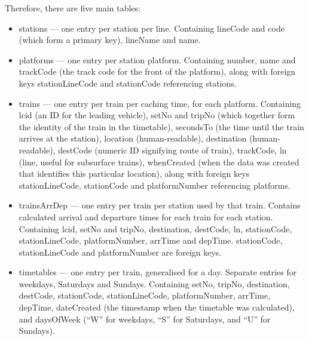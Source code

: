 \documentclass[a4paper,12pt,twoside]{report}
\begin{document}
Therefore, there are five main tables:
\begin{itemize}
  \item stations --- one entry per station per line. Containing lineCode and
    code (which form a primary key), lineName and name.
  \item platforms --- one entry per station platform. Containing number, name
    and trackCode (the track code for the front of the platform), along with
    foreign keys stationLineCode and stationCode referencing stations.
  \item trains --- one entry per train per caching time, for each platform.
    Containing lcid (an ID for the leading vehicle), setNo and tripNo (which
    together form the identity of the train in the timetable), secondsTo (the
    time until the train arrives at the station), location (human-readable),
    destination (human-readable), destCode (numeric ID signifying route of
    train), trackCode, ln (line, useful for subsurface trains), whenCreated
    (when the data was created that identifies this particular location), along
    with foreign keys stationLineCode, stationCode and platformNumber
    referencing platforms.
  \item trainsArrDep --- one entry per train per station used by that train.
    Contains calculated arrival and departure times for each train for each
    station. Containing lcid, setNo and tripNo, destination, destCode, ln,
    stationCode, stationLineCode, platformNumber, arrTime and depTime.
    stationCode, stationLineCode and platformNumber are foreign keys.
  \item timetables --- one entry per train, generalised for a day. Separate
    entries for weekdays, Saturdays and Sundays. Containing setNo, tripNo,
    destination, destCode, stationCode, stationLineCode, platformNumber,
    arrTime, depTime, dateCreated (the timestamp when the timetable was
    calculated), and daysOfWeek (``W'' for weekdays, ``S'' for Saturdays, and
    ``U'' for Sundays).
\end{itemize}
\end{document}
